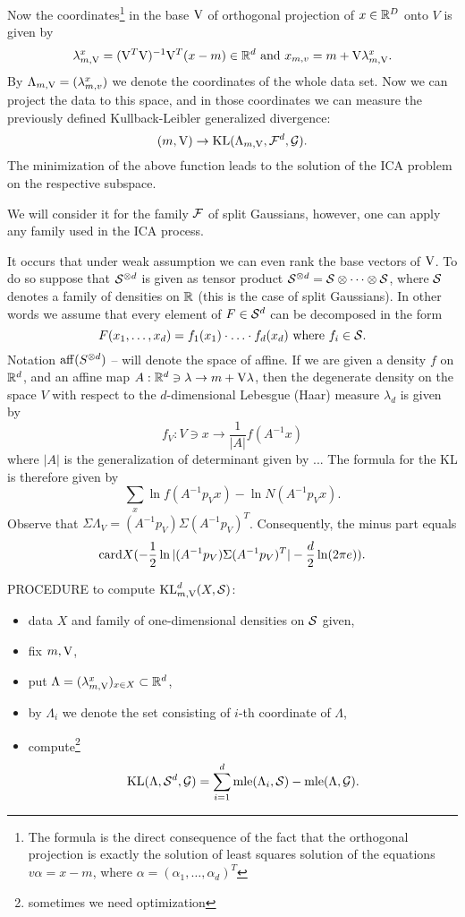 Now the coordinates\footnote{The formula is the direct consequence of the fact that the orthogonal projection is exactly the solution of least squares solution of the equations 
$v \alpha=x-m$, where $\alpha=(\alpha_1,\ldots,\alpha_d)^T$} in the base $\v$ of orthogonal projection of $x \in \R^D$ onto $V$ is given by
\begin{equation} \label{eq:coord}
\lambda_{m,\v}^x=(\v^T\v)^{-1}\v^T(x-m) \in \R^d \text{ and }
x_{m,v}=m+\v\lambda_{m,\v}^x.
\end{equation}
By $\Lambda_{m,\v}=(\lambda^x_{m,v})$ we denote the coordinates of the whole data set.
Now we can project the data to this space, and in those coordinates we can measure
the previously defined Kullback-Leibler generalized divergence:
\begin{equation} \label{eq:KL}
(m,\v) \to \KL(\Lambda_{m,\v},\F^d,\G).
\end{equation}
The minimization of the above function leads to the solution of the ICA
problem on the respective subspace.

We will consider it for the family $\F$ of split Gaussians, however, one can apply any family used in the ICA process.
 
	 It occurs that under weak assumption we can even rank the base vectors of $\v$. To do so suppose that $\S^{\otimes d}$ is given as tensor product 
$\S^{\otimes d}=\S \otimes \cdots \otimes \S$, where $\S$ denotes a family of densities on $\R$
(this is the case of split Gaussians). 
In other words we assume that every element of $F \in \S^d$ can be decomposed in the form 
$$
F(x_1,\ldots,x_d)=f_1(x_1) \cdot \ldots \cdot f_d(x_d)\text{ where }f_i \in \S.
$$
Notation $\aff(S^{\otimes d})$ -- will denote the space of affine. If we are given
a density $f$ on $\R^d$, and an affine map $A:\R^d \ni \lambda \to m+\v \lambda$, then
the degenerate density on the space $V$ with respect to the $d$-dimensional Lebesgue (Haar) measure  $\lambda_d$ is given by
$$
f_V:V \ni x \to \frac{1}{|A|}f(A^{-1}x)
$$
where $|A|$ is the generalization of determinant given by ... 
The formula for the KL is therefore given by
$$
\sum_x \ln f(A^{-1}p_Vx) -\ln N(A^{-1}p_Vx).
$$
Observe that $\Sigma \Lambda_V=(A^{-1}p_V)\Sigma(A^{-1}p_V)^T$.
Consequently, the minus part equals
$$
\card X(-\frac{1}{2}\ln |(A^{-1}p_V)\Sigma(A^{-1}p_V)^T|-\frac{d}{2}\ln(2\pi e)).
$$

PROCEDURE to compute $\KL^d_{m,\v}(X,\S)$:
\begin{itemize}
\item data $X$ and family of one-dimensional densities on $\S$ given,
\item fix $m,\v$,
\item put $\Lambda=(\lambda_{m,\v}^x)_{x \in X} \subset \R^d$,
\item by $\Lambda_i$ we denote the set consisting of $i$-th coordinate of $\Lambda$,
\item compute\footnote{sometimes we need optimization}
$$
\KL(\Lambda,\S^d,\G)=\sum_{i=1}^d \mle(\Lambda_i,\S)-\mle(\Lambda,\G).
$$
\end{itemize}

